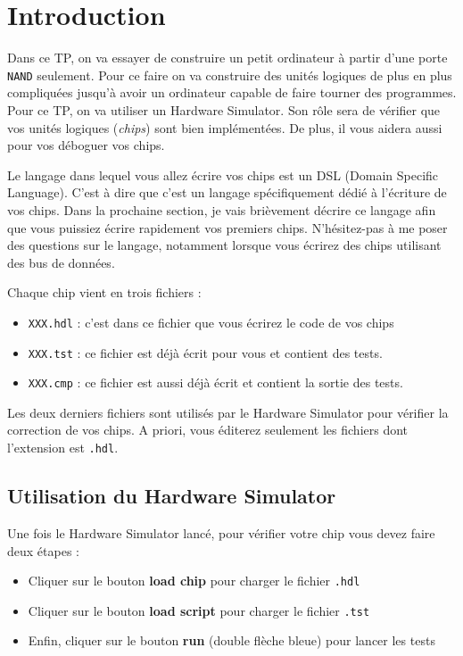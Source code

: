 \documentclass[11pt]{article}
\newcommand{\numtd}{03}
\newcommand{\titretd}{Construire un vrai ordinateur ?}
\begin{document}
\entete{\numtd}{\titretd}

\section{Introduction}

Dans ce TP, on va essayer de construire un petit ordinateur à partir d'une porte \texttt{NAND} seulement. Pour ce faire on va construire des unités logiques de plus en plus compliquées jusqu'à avoir un ordinateur capable de faire tourner des programmes. Pour ce TP, on va utiliser un Hardware Simulator. Son rôle sera de vérifier que vos unités logiques (\textit{chips}) sont bien implémentées. De plus, il vous aidera aussi pour vos déboguer vos chips.

Le langage dans lequel vous allez écrire vos chips est un DSL (Domain Specific Language). C'est à dire que c'est un langage spécifiquement dédié à l'écriture de vos chips. Dans la prochaine section, je vais brièvement décrire ce langage afin que vous puissiez écrire rapidement vos premiers chips. N'hésitez-pas à me poser des questions sur le langage, notamment lorsque vous écrirez des chips utilisant des bus de données.

Chaque chip vient en trois fichiers :
\begin{itemize}
\item \texttt{XXX.hdl} : c'est dans ce fichier que vous écrirez le code de vos chips
\item \texttt{XXX.tst} : ce fichier est déjà écrit pour vous et contient des tests.
\item \texttt{XXX.cmp} : ce fichier est aussi déjà écrit et contient la sortie des tests.
\end{itemize}

Les deux derniers fichiers sont utilisés par le Hardware Simulator pour vérifier la correction de vos chips. A priori, vous éditerez seulement les fichiers dont l'extension est \texttt{.hdl}.

\subsection*{Utilisation du Hardware Simulator} Une fois le Hardware Simulator lancé, pour vérifier votre chip vous devez faire deux étapes :
\begin{itemize}
\item Cliquer sur le bouton \textbf{load chip} pour charger le fichier \texttt{.hdl}
\item Cliquer sur le bouton \textbf{load script} pour charger le fichier \texttt{.tst}
\item Enfin, cliquer sur le bouton \textbf{run} (double flèche bleue) pour lancer les tests
\end{itemize}
\end{document}

